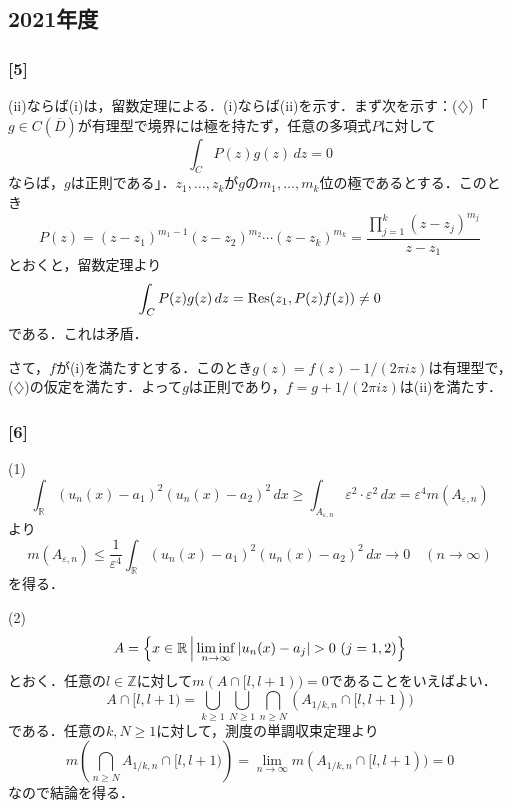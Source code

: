 \documentclass[a4j]{ltjsarticle}
\newcommand{\Rset}{\mathbb{R}}
\newcommand{\Zset}{\mathbb{Z}}
\newcommand{\1}{\mathbbm{1}}
\numberwithin{equation}{section}
\theoremstyle{definition}
\begin{document}
\subsection{2021年度}
\subsubsection*{[5]}
(ii)ならば(i)は，留数定理による．(i)ならば(ii)を示す．まず次を示す：($\diamondsuit$)「$g\in C(\overline{D})$が有理型で境界には極を持たず，任意の多項式$P$に対して
\begin{equation}
    \int_{C}P(z)g(z)\,dz=0 
\end{equation}
ならば，$g$は正則である」．$z_1,\ldots,z_k$が$g$の$m_1,\ldots,m_k$位の極であるとする．このとき
\begin{equation}
    P(z)=(z-z_1)^{m_1-1}(z-z_2)^{m_2}\cdots (z-z_k)^{m_k}=\frac{\prod_{j=1}^k(z-z_j)^{m_j}}{z-z_1}
\end{equation}
とおくと，留数定理より
\begin{equation}
    \int_{C}P(z)g(z)\,dz=\Residue(z_1,P(z)f(z))\neq0 
\end{equation}
である．これは矛盾．

さて，$f$が(i)を満たすとする．このとき$g(z)=f(z)-1/(2\pi iz)$は有理型で，($\diamondsuit$)の仮定を満たす．よって$g$は正則であり，$f=g+1/(2\pi iz)$は(ii)を満たす．

\subsubsection*{[6]}\label{pm_2021_6}
(1) 
\begin{equation}
    \int_{\Rset}(u_n(x)-a_1)^2(u_n(x)-a_2)^2\,dx\geq \int_{A_{\varepsilon,n}}\varepsilon^2\cdot \varepsilon^2\,dx=\varepsilon^4m(A_{\varepsilon,n})
\end{equation}
より
\begin{equation}
    m(A_{\varepsilon,n})\leq \frac{1}{\varepsilon^4}\int_{\Rset}(u_n(x)-a_1)^2(u_n(x)-a_2)^2\,dx\to0\quad (n\to\infty)
\end{equation}
を得る．

(2) 
\begin{equation}
    A=\qty{x\in \Rset\,\middle|\, \liminf_{n\to\infty}\abs{u_n(x)-a_j}>0\ (j=1,2)}
\end{equation}
とおく．任意の$l\in\Zset$に対して$m(A\cap [l,l+1))=0$であることをいえばよい．
\begin{equation}
    A\cap[l,l+1)=\bigcup_{k\geq 1}\bigcup_{N\geq 1}\bigcap_{n\geq N}(A_{1/k,n}\cap [l,l+1))
\end{equation}
である．任意の$k,N\geq 1$に対して，測度の単調収束定理より
\begin{equation}
    m\left(\bigcap_{n\geq N}A_{1/k,n}\cap[l,l+1) \right)=\lim_{n\to\infty}m(A_{1/k,n}\cap[l,l+1))=0 
\end{equation}
なので結論を得る．
\end{document}
